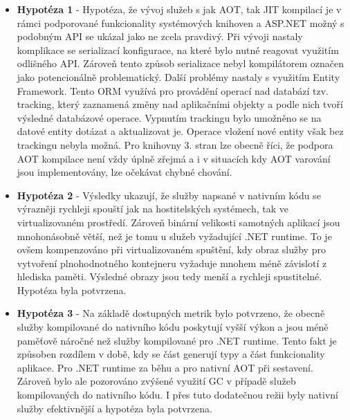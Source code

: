 \begin{itemize}
  \item \textbf{Hypotéza 1} - Hypotéza, že vývoj služeb s jak AOT, tak JIT kompilací je v rámci podporované funkcionality systémových knihoven a ASP.NET možný s podobným API se ukázal jako ne zcela pravdivý. Při vývoji nastaly komplikace se serializací konfigurace, na které bylo nutné reagovat využitím odlišného API. Zároveň tento způsob serializace nebyl kompilátorem označen jako potencionálně problematický. Další problémy nastaly s využitím Entity Framework. Tento ORM využívá pro provádění operací nad databází tzv. tracking, který zaznamená změny nad aplikačními objekty a podle nich tvoří výsledné databázové operace. Vypnutím trackingu bylo umožněno se na datové entity dotázat a aktualizovat je. Operace vložení nové entity však bez trackingu nebyla možná. Pro knihovny 3. stran lze obecně říci, že podpora AOT kompilace není vždy úplně zřejmá a i v situacích kdy AOT varování jsou implementovány, lze očekávat chybné chování.
  \item \textbf{Hypotéza 2} - Výsledky ukazují, že služby napsané v nativním kódu se výrazněji rychleji spouští jak na hostitelských systémech, tak ve virtualizovaném prostředí. Zároveň binární velikosti samotných aplikací jsou mnohonásobně větší, než je tomu u služeb vyžadující .NET runtime. To je ovšem kompenzováno při virtualizovaném spuštění, kdy obraz služby pro vytvoření plnohodnotného kontejneru vyžaduje mnohem méně závislotí z hlediska paměti. Výsledné obrazy jsou tedy menší a rychleji spustitelné. Hypotéza byla potvrzena.
  \item \textbf{Hypotéza 3} - Na základě dostupných metrik bylo potvrzeno, že obecně služby kompilované do nativního kódu poskytují vyšší výkon a jsou méně paměťově náročné než služby kompilované pro .NET runtime. Tento fakt je způsoben rozdílem v době, kdy se část generují typy a část funkcionality aplikace. Pro .NET runtime za běhu a pro nativní AOT při sestavení. Zároveň bylo ale pozorováno zvýšené využití GC v případě služeb kompilovaných do nativního kódu. I přes tuto dodatečnou režii byly nativní služby efektivnější a hypotéza byla potvrzena.
\end{itemize}